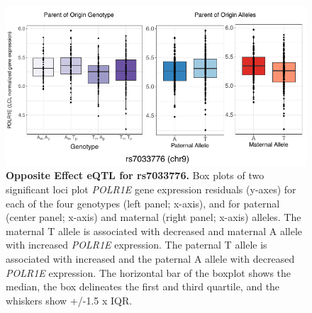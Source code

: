 \begin{figure}[!htb]
\centering
\includegraphics[width=5in]{img/ch02/fig-s15.pdf}
\caption[Opposite Effect eQTL for rs7033776.]{\textbf{Opposite Effect eQTL for rs7033776.} Box plots of two significant loci plot \emph{POLR1E} gene expression residuals (y-axes) for each of the four genotypes (left panel; x-axis), and for paternal (center panel; x-axis) and maternal (right panel; x-axis) alleles. The maternal T allele is associated with decreased and maternal A allele with increased \emph{POLR1E} expression. The paternal T allele is associated with increased and the paternal A allele with decreased \emph{POLR1E} expression. The horizontal bar of the boxplot shows the median, the box delineates the first and third quartile, and the whiskers show +/-1.5 x IQR.}
\label{fig:fig-s15}
\end{figure}



